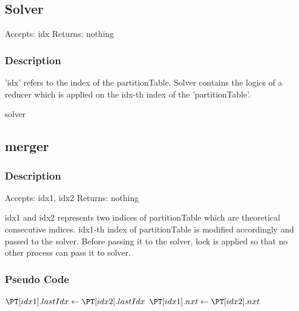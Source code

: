 \documentclass{article}
\begin{document}
\begin{flushleft}
\subsection{Solver}

Accepts: idx
Returns: nothing

\subsubsection*{Description}
'idx' refers to the index of the partitionTable. Solver contains the logics of a reducer which is applied on the idx-th index of the 'partitionTable'.

\IncMargin{1em}
\begin{algorithm}
\caption{solver}\label{algo_solver}
\end{algorithm}\DecMargin{1em}

\newpage

\subsection{merger}

\subsubsection*{Description}

Accepts: idx1, idx2 \BlankLine
Returns: nothing \BlankLine

idx1 and idx2 represents two indices of partitionTable which are theoretical consecutive indices. idx1-th index of partitionTable is modified accordingly and passed to the solver. Before passing it to the solver, lock is applied so that no other process can pass it to solver.

\subsubsection*{Pseudo Code}

\IncMargin{1em}
\begin{algorithm}




\BlankLine

$ \PT[idx1].lastIdx \leftarrow \PT[idx2].lastIdx$ \; 
$ \PT[idx1].nxt \leftarrow \PT[idx2].nxt $ \;


\end{algorithm}
\end{flushleft}
\end{document}
